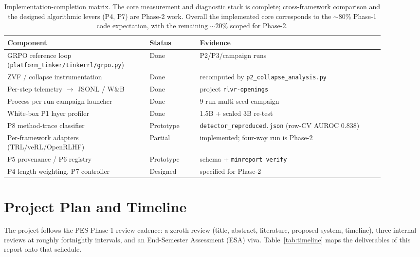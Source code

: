 \documentclass[12pt,a4paper]{report}
\begin{document}
\begin{table}[h]
\centering\small
\begin{tabular}{@{}L{0.34\linewidth}L{0.12\linewidth}L{0.44\linewidth}@{}}
\toprule
\textbf{Component} & \textbf{Status} & \textbf{Evidence} \\
\midrule
GRPO reference loop (\texttt{platform_tinker/tinkerrl/grpo.py}) & Done & P2/P3/campaign runs \\
ZVF / collapse instrumentation & Done & recomputed by \texttt{p2\_collapse\_analysis.py} \\
Per-step telemetry $\to$ JSONL / W\&B & Done & project \texttt{rlvr-openings} \\
Process-per-run campaign launcher & Done & 9-run multi-seed campaign \\
White-box P1 layer profiler & Done & 1.5B + scaled 3B re-test \\
P8 method-trace classifier & Prototype & \texttt{detector\_reproduced.json} (row-CV AUROC $0.838$) \\
Per-framework adapters (TRL/veRL/OpenRLHF) & Partial & implemented; four-way run is Phase-2 \\
P5 provenance / P6 registry & Prototype & schema + \texttt{minreport verify} \\
P4 length weighting, P7 controller & Designed & specified for Phase-2 \\
\bottomrule
\end{tabular}
\caption{Implementation-completion matrix. The core measurement and diagnostic stack is
complete; cross-framework comparison and the designed algorithmic levers (P4, P7) are
Phase-2 work. Overall the implemented core corresponds to the ${\sim}80\%$
Phase-1 code expectation, with the remaining ${\sim}20\%$ scoped for Phase-2.}
\label{tab:impl}
\end{table}

\section{Project Plan and Timeline}
The project follows the PES Phase-1 review cadence: a zeroth review (title, abstract,
literature, proposed system, timeline), three internal reviews at roughly fortnightly
intervals, and an End-Semester Assessment (ESA) viva. Table~\ref{tab:timeline} maps the
deliverables of this report onto that schedule.
\end{document}
